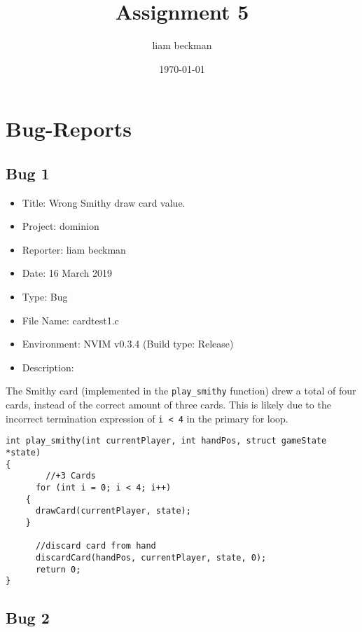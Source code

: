 \documentclass[11pt]{article}
\author{liam beckman}
\date{\today}
\title{Assignment 5}
\begin{document}
\maketitle


\section{Bug-Reports}
\label{sec:bugreports}
\subsection{Bug 1}
\label{sec:bug}

\begin{itemize}
\item Title: Wrong Smithy draw card value.
\item Project: dominion
\item Reporter: liam beckman
\item Date: 16 March 2019
\item Type: Bug
\item File Name: cardtest1.c
\item Environment: NVIM v0.3.4 (Build type: Release)
\item Description:
\end{itemize}

The Smithy card (implemented in the \texttt{play\_smithy} function) drew a total of four cards, instead of the correct amount of three cards. This is likely due to the incorrect termination expression of \texttt{i < 4} in the primary for loop.

\begin{verbatim}
int play_smithy(int currentPlayer, int handPos, struct gameState *state)
{
        //+3 Cards
      for (int i = 0; i < 4; i++)
    {
      drawCard(currentPlayer, state);
    }
            
      //discard card from hand
      discardCard(handPos, currentPlayer, state, 0);
      return 0;
}
\end{verbatim}

\subsection{Bug 2}
\label{sec:bug1}
\end{document}
